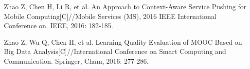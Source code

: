 
\begin{publications}{99}
    \item\textsc Zhao Z, Chen H, Li R, et al. An Approach to Context-Aware Service Pushing for Mobile Computing[C]//Mobile Services (MS), 2016 IEEE International Conference on. IEEE, 2016: 182-185.
    \item\textsc Zhao Z, Wu Q, Chen H, et al. Learning Quality Evaluation of MOOC Based on Big Data Analysis[C]//International Conference on Smart Computing and Communication. Springer, Cham, 2016: 277-286.
\end{publications}

